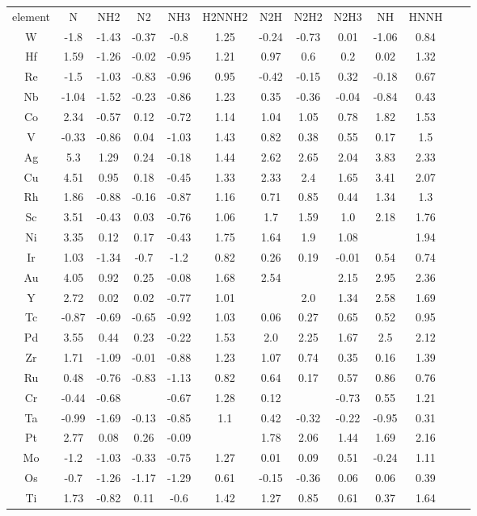 \begin{center}
\begin{tabular}{| c | c | c | c | c | c | c | c | c | c | c | c | c |}
\hline
element & N & NH2 & N2 & NH3 & H2NNH2 & N2H & N2H2 & N2H3 & NH & HNNH\hline
\\
W & -1.8 & -1.43 & -0.37 & -0.8 & 1.25 & -0.24 & -0.73 & 0.01 & -1.06 & 0.84 \\
Hf & 1.59 & -1.26 & -0.02 & -0.95 & 1.21 & 0.97 & 0.6 & 0.2 & 0.02 & 1.32 \\
Re & -1.5 & -1.03 & -0.83 & -0.96 & 0.95 & -0.42 & -0.15 & 0.32 & -0.18 & 0.67 \\
Nb & -1.04 & -1.52 & -0.23 & -0.86 & 1.23 & 0.35 & -0.36 & -0.04 & -0.84 & 0.43 \\
Co & 2.34 & -0.57 & 0.12 & -0.72 & 1.14 & 1.04 & 1.05 & 0.78 & 1.82 & 1.53 \\
V & -0.33 & -0.86 & 0.04 & -1.03 & 1.43 & 0.82 & 0.38 & 0.55 & 0.17 & 1.5 \\
Ag & 5.3 & 1.29 & 0.24 & -0.18 & 1.44 & 2.62 & 2.65 & 2.04 & 3.83 & 2.33 \\
Cu & 4.51 & 0.95 & 0.18 & -0.45 & 1.33 & 2.33 & 2.4 & 1.65 & 3.41 & 2.07 \\
Rh & 1.86 & -0.88 & -0.16 & -0.87 & 1.16 & 0.71 & 0.85 & 0.44 & 1.34 & 1.3 \\
Sc & 3.51 & -0.43 & 0.03 & -0.76 & 1.06 & 1.7 & 1.59 & 1.0 & 2.18 & 1.76 \\
Ni & 3.35 & 0.12 & 0.17 & -0.43 & 1.75 & 1.64 & 1.9 & 1.08 &  & 1.94 \\
Ir & 1.03 & -1.34 & -0.7 & -1.2 & 0.82 & 0.26 & 0.19 & -0.01 & 0.54 & 0.74 \\
Au & 4.05 & 0.92 & 0.25 & -0.08 & 1.68 & 2.54 &  & 2.15 & 2.95 & 2.36 \\
Y & 2.72 & 0.02 & 0.02 & -0.77 & 1.01 &  & 2.0 & 1.34 & 2.58 & 1.69 \\
Tc & -0.87 & -0.69 & -0.65 & -0.92 & 1.03 & 0.06 & 0.27 & 0.65 & 0.52 & 0.95 \\
Pd & 3.55 & 0.44 & 0.23 & -0.22 & 1.53 & 2.0 & 2.25 & 1.67 & 2.5 & 2.12 \\
Zr & 1.71 & -1.09 & -0.01 & -0.88 & 1.23 & 1.07 & 0.74 & 0.35 & 0.16 & 1.39 \\
Ru & 0.48 & -0.76 & -0.83 & -1.13 & 0.82 & 0.64 & 0.17 & 0.57 & 0.86 & 0.76 \\
Cr & -0.44 & -0.68 &  & -0.67 & 1.28 & 0.12 &  & -0.73 & 0.55 & 1.21 \\
Ta & -0.99 & -1.69 & -0.13 & -0.85 & 1.1 & 0.42 & -0.32 & -0.22 & -0.95 & 0.31 \\
Pt & 2.77 & 0.08 & 0.26 & -0.09 &  & 1.78 & 2.06 & 1.44 & 1.69 & 2.16 \\
Mo & -1.2 & -1.03 & -0.33 & -0.75 & 1.27 & 0.01 & 0.09 & 0.51 & -0.24 & 1.11 \\
Os & -0.7 & -1.26 & -1.17 & -1.29 & 0.61 & -0.15 & -0.36 & 0.06 & 0.06 & 0.39 \\
Ti & 1.73 & -0.82 & 0.11 & -0.6 & 1.42 & 1.27 & 0.85 & 0.61 & 0.37 & 1.64 \\
\hline
\end{tabular}
\end{center}